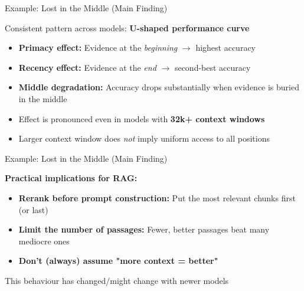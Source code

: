 \documentclass[11pt,compress,t,notes=noshow, xcolor=table]{beamer}
\begin{document}

\begin{frame}{Example: Lost in the Middle (Main Finding)}

\vspace{1em}

Consistent pattern across models: \textbf{U-shaped performance curve}

\vspace{2em}

\begin{itemize}
    \item \textbf{Primacy effect:} Evidence at the \textit{beginning} $\rightarrow$ highest accuracy
    \item \textbf{Recency effect:} Evidence at the \textit{end} $\rightarrow$ second-best accuracy
    \item \textbf{Middle degradation:} Accuracy drops substantially when evidence is buried in the middle
    \item Effect is pronounced even in models with \textbf{32k+ context windows}
    \item[$\Rightarrow$] Larger context window does \textit{not} imply uniform access to all positions
\end{itemize}

\vfill

\end{frame}


\begin{frame}{Example: Lost in the Middle (Main Finding)}

\vspace{1em}

\textbf{Practical implications for RAG:}

\vspace{2em}

\begin{itemize}
    \item \textbf{Rerank before prompt construction:} Put the most relevant chunks first (or last)
    \item \textbf{Limit the number of passages:} Fewer, better passages beat many mediocre ones
    \item \textbf{Don't (always) assume "more context = better"}
\end{itemize}

\vspace{1em}

\begin{center}
	\warning This behaviour has changed/might change with newer models \warning
\end{center}

\vfill

\end{frame}
\end{document}
